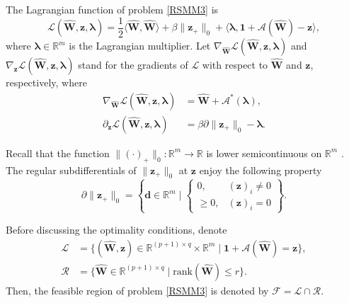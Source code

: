 \documentclass[sn-mathphys]{JORSC-jnl}%
\theoremstyle{thmstyleone}%
\theoremstyle{thmstylethree}%
\theoremstyle{thmstyleone} %
\begin{document}
The Lagrangian function of problem \eqref{RSMM3} is 
\begin{equation*}
\mathscr{L}(\hat{\mathbf{W}},\mathbf{z},\bm{\lambda})=\frac{1}{2}\langle\hat{\mathbf{W}},\hat{\mathbf{W}}\rangle+\beta\|{\mathbf{z}}_+\|_0+\langle \bm{\lambda}, {\mathbf{1}}+\mathscr{A}(\hat{\mathbf{W}})-\mathbf{z}\rangle,
\end{equation*}
where $\bm{\lambda}\in\mathbb{R}^m$ is the Lagrangian multiplier. Let $\nabla_{\hat{\mathbf{W}}}\mathscr{L}(\hat{\mathbf{W}},\mathbf{z},\bm{\lambda})$ and $\nabla_{\mathbf{z}}\mathscr{L}(\hat{\mathbf{W}},\mathbf{z},\bm{\lambda})$ stand for the gradients of $\mathscr{L}$ with respect to $\hat{\mathbf{W}}$ and $\mathbf{z}$, respectively,
where
\begin{equation*}
\begin{aligned}
\nabla_{\hat{\mathbf{W}}}\mathscr{L}(\hat{\mathbf{W}},\mathbf{z},\bm{\lambda})
&= \hat{\mathbf{W}}+\mathscr{A}^*(\bm{\lambda}),\\
\partial_{\mathbf{z}}\mathscr{L}(\hat{\mathbf{W}},\mathbf{z},\bm{\lambda})
&= \beta\partial\|\mathbf{z}_+\|_0 - \bm{\lambda}.
\end{aligned}
\end{equation*}

Recall that the function $\|(\cdot)_+\|_{0} : \mathbb{R}^{m} \rightarrow \mathbb{R}$ is lower semicontinuous on $\mathbb{R}^{m}$ \cite{pan2017optimality}. The regular subdifferentials of $\|\mathbf{z}_{+}\|_{0}$ at $\mathbf{z}$ enjoy the following property
$$ \partial\|\mathbf{z}_{+}\|_{0} = \left\{ \mathbf{d} \in \mathbb{R}^{m} \mid \begin{cases} 0, & (\mathbf{z})_{i} \neq 0\\ \geq 0, & (\mathbf{z})_{i} = 0 \end{cases}  \right\}.$$

Before discussing the optimality conditions,  denote 
\begin{equation*}
		\begin{aligned}
		\mathcal{L}& =\{(\hat{\mathbf{W}},\mathbf{z})\in\mathbb{R}^{(p+1)\times q}\times\mathbb{R}^m  \mid \mathbf{1}+\mathscr{A}(\hat{\mathbf{W}})=\mathbf{z} \},\\
		\mathcal{R}&=\{\hat{\mathbf{W}}\in\mathbb{R}^{(p+1)\times q}\mid \text{rank}(\hat{\mathbf{W}}) \leq r \}.
	\end{aligned}
	\end{equation*}
     Then, the feasible region of problem \eqref{RSMM3} is denoted by $\mathcal{F}=\mathcal{L}\cap \mathcal{R}$.
\end{document}

